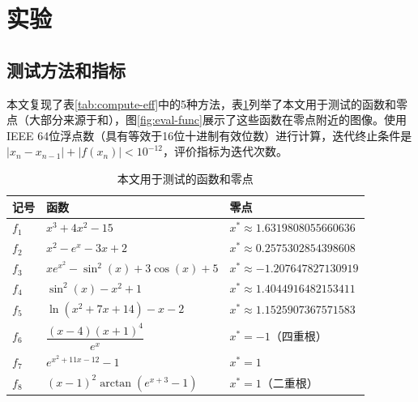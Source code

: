 
\section{实验}

\subsection{测试方法和指标}

本文复现了表\ref{tab:compute-eff}中的5种方法，表\ref{tab:eval-func}列举了本文用于测试的函数和零点（大部分来源于\cite{kou2006modified}和\cite{chun2012new}），图\ref{fig:eval-func}展示了这些函数在零点附近的图像。使用IEEE 64位浮点数（具有等效于16位十进制有效位数）进行计算，迭代终止条件是$|x_{n} - x_{n-1}| + |f(x_n)| < 10^{-12}$，评价指标为迭代次数。




\begin{table}[!htbp]
    \centering
    \caption{本文用于测试的函数和零点}
    \label{tab:eval-func}
    \begin{tabular}{lll}
        \toprule
        记号 & 函数 & 零点\\
        \midrule
        $f_1$ & $x^3+4x^2-15$ & $x^*\approx 1.6319808055660636 $ \\
        $f_2$ & $x^2 - e^x - 3x + 2$ & $x^* \approx 0.2575302854398608$ \\
        $f_3$ & $xe^{x^2} - \sin^2(x) + 3\cos(x) + 5$ & $x^*\approx -1.207647827130919$ \\
        $f_4$ & $\sin^2(x) - x^2 + 1$ & $x^*\approx 1.4044916482153411 $ \\
        $f_5$ & $\ln(x^2 + 7x+ 14) - x - 2$ & $x^* \approx 1.1525907367571583$ \\
        $f_6$ & $\dfrac{(x - 4)(x + 1)^4}{e^x}$ & $x^*=-1$（四重根） \\
        $f_7$ & $e^{x^{2} + 11 x - 12} - 1$ & $x^*= 1$ \\
        $f_8$ & $(x - 1)^2\arctan(e^{x + 3} - 1)$ & $x^*= 1$（二重根） \\
        \bottomrule
    \end{tabular}    
\end{table}



